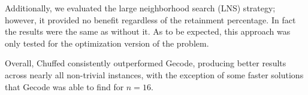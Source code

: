 Additionally, we evaluated the large neighborhood search (LNS) strategy; however, it provided no benefit regardless of the retainment percentage. In fact the results were the same as without it. As to be expected, this approach was only tested for the optimization version of the problem.

Overall, Chuffed consistently outperformed Gecode, producing better results across nearly all non-trivial instances, with the exception of some faster solutions that Gecode was able to find for $n=16$. 

\begin{table}[h!]
\centering
{}
\caption{Optimization version: runtime in seconds and found objective value for different combinations of models, solvers and search strategies.}
\label{cp-opt-results}
\end{table}
